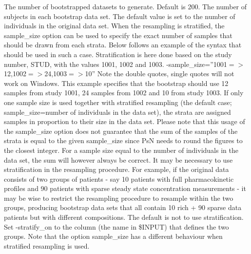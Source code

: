 \begin{optionlist}
The number of bootstrapped datasets to generate. Default is 200. 
\nextopt
{}
The number of subjects in each bootstrap data set. The default       value is set to the number of individuals in the original data set. When the resampling is stratified, the sample\_size option can be used to specify the exact number of samples that should be drawn from each strata. Below follows an example of the syntax that should be used in such a case. Stratification is here done based on the study number, STUD, with the values 1001, 1002 and 1003.  -sample\_size=''1001$=>$12,1002$=>$24,1003$=>$10''                          Note the double quotes, single quotes will not work on Windows. This example specifies that the bootstrap should use 12 samples from study 1001, 24 samples from 1002 and 10 from study 1003. If only one sample size is used together with stratified resampling (the default case; sample\_size=number of individuals in the data set), the strata are assigned samples in proportion to their size in the data set. Please note that this usage of the sample\_size option does not guarantee that the sum of the samples of the strata is equal to the given sample\_size since PsN needs to round the figures to the closest integer. For a sample size equal to the number of individuals in the data set, the sum will however always be correct. 
\nextopt
{}
It may be necessary to use stratification in the resampling procedure. For example, if the original data consists of two groups of patients - say 10 patients with full pharmacokinetic profiles and 90 patients with sparse steady state concentration measurements - it may be wise to restrict the resampling procedure to resample within the two groups, producing bootstrap data sets that all contain 10 rich + 90 sparse data patients but with different compositions. The default is not to use stratification. Set -stratify\_on to the column (the name in \$INPUT) that defines the two groups. Note that the option sample\_size has a different behaviour when stratified resampling is used. 


\end{optionlist}
